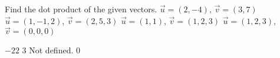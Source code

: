 
\begin{Exercise}[
name={},
title={}, 
difficulty=0,
origin={\cite{GHC}}]
Find the dot product of the given vectors.
\Question $\vec u = (2,-4)$, $\vec v = (3,7)$
\Question $\vec u = (1,-1,2)$, $\vec v = (2,5,3)$
\Question $\vec u = (1,1)$, $\vec v = (1,2,3)$
\Question $\vec u = (1,2,3)$, $\vec v = (0,0,0)$
\end{Exercise}

\begin{Answer}
\Question $-22$
\Question $3$
\Question Not defined.
\Question $0$
\end{Answer}
